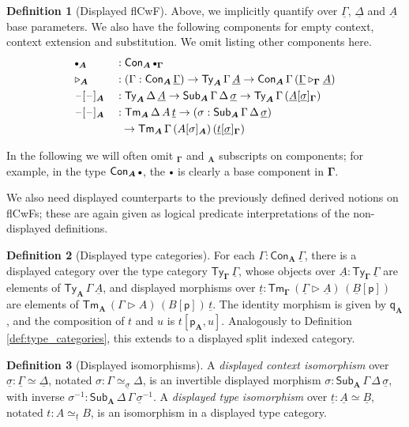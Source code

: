 \documentclass{article}
\theoremstyle{definition}
\newtheorem{definition}{Definition}
\theoremstyle{theorem}
\newcommand{\Con}{\mathsf{Con}}
\newcommand{\Sub}{\mathsf{Sub}}
\newcommand{\Tm}{\mathsf{Tm}}
\newcommand{\Ty}{\mathsf{Ty}}
\newcommand{\blank}{\mathord{\hspace{1pt}\text{--}\hspace{1pt}}}
\newcommand{\ra}{\rightarrow}
\newcommand{\ext}{\triangleright}
\newcommand{\emptycon}{\scaleobj{.75}\bullet}
\newcommand{\p}{\mathsf{p}}
\newcommand{\q}{\mathsf{q}}
\newcommand{\bGamma}{\boldsymbol{\Gamma}}
\newcommand{\bA}{\boldsymbol{A}}
\newcommand{\ul}[1]{\underline{#1}}
\newcommand{\ulGamma}{\ul{\Gamma}}
\newcommand{\ulDelta}{\ul{\Delta}}
\newcommand{\ulsigma}{\ul{\sigma}}
\newcommand{\ult}{\ul{t}}
\newcommand{\ulA}{\ul{A}}
\newcommand{\ulB}{\ul{B}}
\begin{document}
\begin{definition}[Displayed flCwF]
Above, we implicitly quantify over $\ulGamma$, $\ulDelta$ and $\ulA$ base
parameters. We also have the following components for empty context, context
extension and substitution. We omit listing other components here.
\begin{alignat*}{3}
  & \emptycon_{\bA} && : \Con_{\bA}\,\emptycon_{\bGamma}\\
  & \ext_{\bA}      && : (\Gamma : \Con_{\bA}\,\ulGamma)\ra \Ty_{\bA}\,\Gamma\,\ulA \ra
                     \Con_{\bA}\,\Gamma\,(\ulGamma \ext_{\bGamma} \ulA)\\
  & \blank[\blank]_{\bA} && : \Ty_{\bA}\,\Delta\,\ulA \ra \Sub_{\bA}\,\Gamma\,\Delta\,\ulsigma
                     \ra \Ty_{\bA}\,\Gamma\, (\ulA[\ulsigma]_{\bGamma})\\
  & \blank[\blank]_{\bA} && : \Tm_{\bA}\,\Delta\,A\,\ult \ra (\sigma : \Sub_{\bA}\,\Gamma\,\Delta\,\ulsigma)\\
  & && \hspace{0.5em}\ra \Tm_{\bA}\,\Gamma\, (A[\sigma]_{\bA})\,(\ult[\ulsigma]_{\bGamma})
\end{alignat*}
\end{definition}

In the following we will often omit $_{\bGamma}$ and $_{\bA}$ subscripts on
components; for example, in the type $\Con_{\bA}\,\emptycon$, the $\emptycon$ is
clearly a base component in $\bGamma$.

We also need displayed counterparts to the previously defined derived notions on
flCwFs; these are again given as logical predicate interpretations of the
non-displayed definitions.

\begin{definition}[Displayed type categories]
For each $\Gamma : \Con_{\bA}\,\ulGamma$, there is a displayed category over the
type category $\Ty_{\bGamma}\,\ulGamma$, whose objects over $\ulA :
\Ty_{\bGamma}\,\ulGamma$ are elements of $\Ty_{\bA}\,\Gamma\,\ulA$, and
displayed morphisms over $\ult : \Tm_{\bGamma}\,(\ulGamma \ext
\ulA)\,(\ulB[\p])$ are elements of $\Tm_{\bA}\,(\Gamma \ext
A)\,(B[\p])\,\ult$. The identity morphism is given by $\q_{\bA}$, and the
composition of $t$ and $u$ is $t[\p_{\bA},u]$. Analogously to Definition
\ref{def:type_categories}, this extends to a displayed split indexed category.
\end{definition}

\begin{definition}[Displayed isomorphisms]
A \emph{displayed context isomorphism} over $\ulsigma : \ulGamma \simeq
\ulDelta$, notated $\sigma : \Gamma \simeq_{\ulsigma} \Delta$, is an invertible
displayed morphism $\sigma : \Sub_{\bA}\,\Gamma\,\Delta\,\ulsigma$, with inverse
$\sigma^{-1} : \Sub_{\bA}\,\Delta\,\Gamma\,\ulsigma^{-1}$. A \emph{displayed
  type isomorphism} over $\ult : \ulA \simeq \ulB$, notated $t : A \simeq_{\ult}
B$, is an isomorphism in a displayed type category.
\end{definition}
\end{document}
